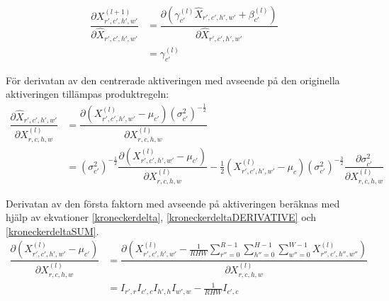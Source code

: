 \documentclass[a4paper,11pt,twoside]{article}
\newcommand*{\pd}[2]{\ensuremath{\dfrac{\partial #1}{\partial #2}}}
\begin{document}
\begin{equation}\label{BN_dxdxhat}
\begin{split}
	\pd{X^{(l+1)}_{r',c',h',w'}}{\hat{X}_{r',c',h',w'}}
		& = \pd{(\gamma_{c'}^{(l)} \hat{X}_{r',c',h',w'} + \beta_{c'}^{(l)})}{\hat{X}_{r',c',h',w'}} \\
		& =\gamma_{c'}^{(l)}
\end{split}
\end{equation}

För derivatan av den centrerade aktiveringen med avseende på den originella aktiveringen tillämpas produktregeln: \cite{webBN1} \cite{webBN2}
\begin{equation}\label{BN_kedjeregeln}
\begin{split}
\pd{\hat{X}_{r',c',h',w'}}{{X}^{(l)}_{r,c,h,w}} 
	& = \pd{(X^{(l)}_{r',c',h',w'} - \mu_{c'}){(\sigma^2_{c'})}^{-\frac{1}{2}}}{{X}^{(l)}_{r,c,h,w}} \\
	& = {(\sigma^2_{c'})}^{-\frac{1}{2}} \pd{(X^{(l)}_{r',c',h',w'} - \mu_{c'})}{{X}^{(l)}_{r,c,h,w}} - \frac{1}{2}(X^{(l)}_{r',c',h',w'} - \mu_c){(\sigma^2_{c'})}^{-\frac{3}{2}} \pd{\sigma^2_{c'}}{{X}^{(l)}_{r,c,h,w}}
\end{split}
\end{equation}

Derivatan av den första faktorn med avseende på aktiveringen beräknas med hjälp av ekvationer \eqref{kroneckerdelta}, \eqref{kroneckerdeltaDERIVATIVE} och \eqref{kroneckerdeltaSUM}. \cite{webBN1} \cite{webBN2}
\begin{equation}\label{mu'}
\begin{split}
\pd{(X^{(l)}_{r',c',h',w'} - \mu_{c'})}{{X}^{(l)}_{r,c,h,w}}
	& = \pd{({X^{(l)}_{r',c',h',w'} - \frac{1}{RHW} \sum\limits^{R-1}_{r''=0} \sum\limits^{H-1}_{h''=0} \sum\limits^{W-1}_{w''=0} X^{(l)}_{r'',c',h'',w''}})}{{X}^{(l)}_{r,c,h,w}} \\
	& = I_{r',r} I_{c',c} I_{h',h} I_{w',w} - \frac{1}{RHW} I_{c',c}
\end{split}
\end{equation}
\end{document}
